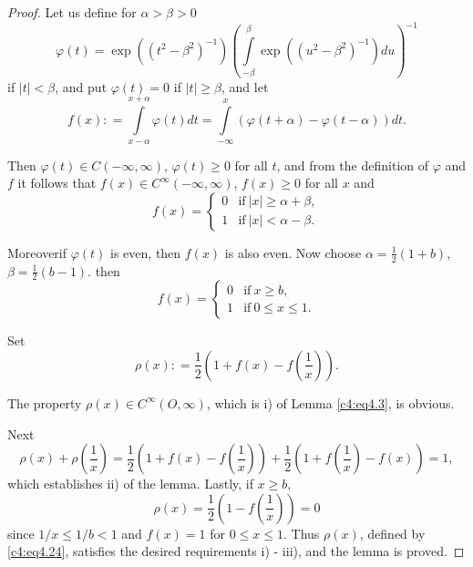 \begin{proof}
  Let us define for $\alpha > \beta > 0$
  $$
  \varphi (t) = \exp\left((t^2 -\beta^2)^{-1} \right)
  \left(\int\limits_{-\beta}^\beta \exp\left((u^2 -\beta^2)^{-1}\right)du\right)^{-1}
  $$
  if $|t|< \beta$, and put $\varphi(t) =0$ if $|t|\geq \beta$, and let
  $$
  f(x) : = \int\limits_{x- \alpha}^{x + \alpha} \varphi (t) dt =
  \int\limits_{-\infty}^{x} \left(\varphi (t+ \alpha)- \varphi (t-\alpha)\right)dt.
  $$

Then $\varphi (t) \in C (- \infty, \infty)$, $\varphi(t) \geq 0$ for
all $t$, and from the definition of $\varphi$ and $f$ it follows that
$f(x) \in C^\infty (-\infty, \infty)$, $f(x) \geq 0$ for all $x$ and 
$$
f(x)= \begin{cases}
  0 & \text{if}~ |x|\geq \alpha+ \beta,\\
  1 & \text{if}~ |x| < \alpha - \beta.
\end{cases}
$$

Moreover\pageoriginale if $\varphi(t)$ is even, then $f(x)$ is also
even. Now choose $\alpha= \frac{1}{2} (1+b)$, $\beta = \frac{1}{2}
(b-1)$. then 
$$
f(x)= \begin{cases}
  0 & \text{if}~ x \geq b,\\
  1 & \text{if}~ 0 \leq x \leq 1.
\end{cases}
$$

Set
\begin{equation}
  \rho (x) : = \frac{1}{2} \left(1+ f(x)- f\left(\frac{1}{x}
  \right) \right). \label{c4:eq4.24} 
\end{equation}

The property $\rho (x) \in C^\infty (O, \infty)$, which is i) of Lemma
\eqref{c4:eq4.3}, is obvious. 

Next 
$$
\rho (x) + \rho \left( \frac{1}{x}\right)= \frac{1}{2} \left(1+ f(x) -
f\left(\frac{1}{x} \right)\right) + \frac{1}{2} \left(1+ f\left(\frac{1}{x}
\right)- f(x) \right)=1,
$$ 
which establishes ii) of the lemma. Lastly, if $x \geq b$,
$$
\rho (x) = \frac{1}{2} \left(1- f\left(\frac{1}{x} \right) \right)=0
$$
since $1/x\leq 1/b< 1$ and $f(x) =1$ for $0 \leq x \leq 1$. Thus
$\rho(x)$, defined by \eqref{c4:eq4.24}, satisfies the desired
requirements i) - iii), and the lemma is proved.
\end{proof}

